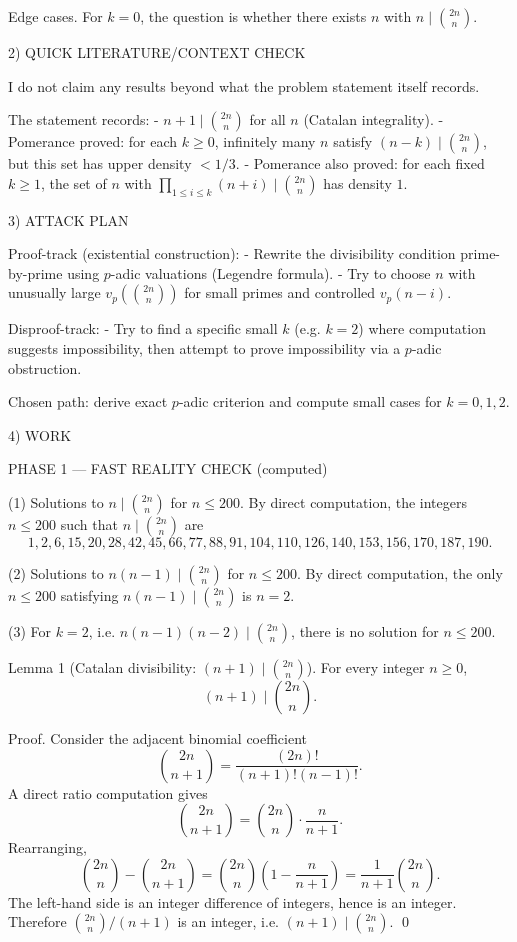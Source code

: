 Edge cases.
For $k=0$, the question is whether there exists $n$ with $n\mid\binom{2n}{n}$.

2) QUICK LITERATURE/CONTEXT CHECK

I do not claim any results beyond what the problem statement itself records.

The statement records:
- $n+1\mid\binom{2n}{n}$ for all $n$ (Catalan integrality).
- Pomerance proved: for each $k\ge 0$, infinitely many $n$ satisfy $(n-k)\mid\binom{2n}{n}$, but this set has upper density $<1/3$.
- Pomerance also proved: for each fixed $k\ge 1$, the set of $n$ with $\prod_{1\le i\le k}(n+i)\mid\binom{2n}{n}$ has density $1$.

3) ATTACK PLAN

Proof-track (existential construction):
- Rewrite the divisibility condition prime-by-prime using $p$-adic valuations (Legendre formula).
- Try to choose $n$ with unusually large $v_p\!\left(\binom{2n}{n}\right)$ for small primes and controlled $v_p(n-i)$.

Disproof-track:
- Try to find a specific small $k$ (e.g. $k=2$) where computation suggests impossibility, then attempt to prove impossibility via a $p$-adic obstruction.

Chosen path: derive exact $p$-adic criterion and compute small cases for $k=0,1,2$.

4) WORK

PHASE 1 — FAST REALITY CHECK (computed)

(1) Solutions to $n\mid\binom{2n}{n}$ for $n\le 200$.
By direct computation, the integers $n\le 200$ such that $n\mid\binom{2n}{n}$ are
\[
1,2,6,15,20,28,42,45,66,77,88,91,104,110,126,140,153,156,170,187,190.
\]

(2) Solutions to $n(n-1)\mid\binom{2n}{n}$ for $n\le 200$.
By direct computation, the only $n\le 200$ satisfying $n(n-1)\mid\binom{2n}{n}$ is $n=2$.

(3) For $k=2$, i.e. $n(n-1)(n-2)\mid\binom{2n}{n}$, there is no solution for $n\le 200$.

Lemma 1 (Catalan divisibility: $(n+1)\mid\binom{2n}{n}$).
For every integer $n\ge 0$,
\[
(n+1)\mid \binom{2n}{n}.
\]

Proof.
Consider the adjacent binomial coefficient
\[
\binom{2n}{n+1}=\frac{(2n)!}{(n+1)!(n-1)!}.
\]
A direct ratio computation gives
\[
\binom{2n}{n+1}=\binom{2n}{n}\cdot \frac{n}{n+1}.
\]
Rearranging,
\[
\binom{2n}{n}-\binom{2n}{n+1}=\binom{2n}{n}\left(1-\frac{n}{n+1}\right)=\frac{1}{n+1}\binom{2n}{n}.
\]
The left-hand side is an integer difference of integers, hence is an integer. Therefore $\binom{2n}{n}/(n+1)$ is an integer, i.e. $(n+1)\mid\binom{2n}{n}$. \qed


